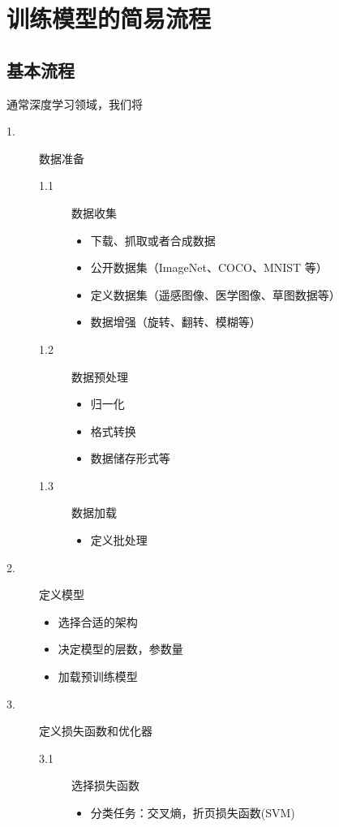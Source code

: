 \section{训练模型的简易流程}

\subsection{基本流程}
通常深度学习领域，我们将


\begin{description}
	\item[1.] 数据准备
	\begin{description}
		\item[1.1] 数据收集
		\begin{itemize}
			\item 下载、抓取或者合成数据
			\item 公开数据集（ImageNet、COCO、MNIST 等）
			\item 定义数据集（遥感图像、医学图像、草图数据等）
			\item 数据增强（旋转、翻转、模糊等）
		\end{itemize}
		\item[1.2] 数据预处理
		\begin{itemize}
			\item 归一化
			\item 格式转换
			\item 数据储存形式等
		\end{itemize}
		\item[1.3] 数据加载
		\begin{itemize}
			\item 定义批处理
		\end{itemize}
	\end{description}
	\item[2.] 定义模型
	\begin{itemize}
		\item 选择合适的架构
		\item 决定模型的层数，参数量
		\item 加载预训练模型
	\end{itemize}
	\item[3.] 定义损失函数和优化器
	\begin{description}
		\item[3.1] 选择损失函数 
		\begin{itemize}
			\item 分类任务：交叉熵，折页损失函数(SVM)

\end{itemize}
\end{description}
\end{description}
